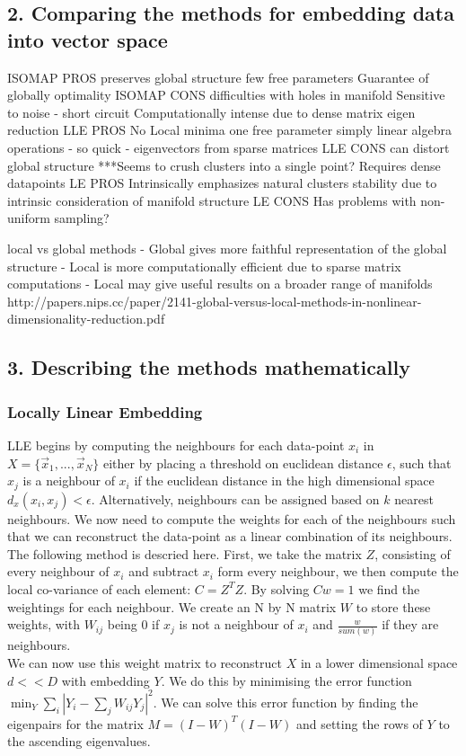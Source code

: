 \documentclass{article}
\begin{document}
\subsection{2. Comparing the methods for embedding data into vector space}
ISOMAP PROS
preserves global structure
few free parameters
Guarantee of globally optimality
ISOMAP CONS
difficulties with holes in manifold
Sensitive to noise - short circuit 
Computationally intense due to dense matrix eigen reduction 
LLE PROS
No Local minima
one free parameter
simply linear algebra operations - so quick - eigenvectors from sparse matrices 
LLE CONS
can distort global structure 
***Seems to crush clusters into a single point?
Requires dense datapoints
LE PROS
Intrinsically emphasizes natural clusters 
stability due to intrinsic consideration of manifold structure
LE CONS
Has problems with non-uniform sampling?

local vs global methods
- Global gives more faithful representation of the global structure
- Local is more computationally efficient due to sparse matrix computations 
- Local may give useful results on a broader range of manifolds
http://papers.nips.cc/paper/2141-global-versus-local-methods-in-nonlinear-dimensionality-reduction.pdf
\subsection{3. Describing the methods mathematically}
\subsubsection{Locally Linear Embedding}
LLE begins by computing the neighbours for each data-point $x_i$ in $X = \{\vec{x}_1,...,\vec{x}_N\}$ either by placing a threshold on euclidean distance $\epsilon$, such that $x_j$ is a neighbour of $x_i$ if the euclidean distance in the high dimensional space $d_x(x_i,x_j) < \epsilon$. Alternatively, neighbours can be assigned based on $k$ nearest neighbours. We now need to compute the weights for each of the neighbours such that we can reconstruct the data-point as a linear combination of its neighbours. The following method is descried here.\cite{LLERoweis} First, we take the matrix $Z$, consisting of every neighbour of $x_i$ and subtract $x_i$ form every neighbour, we then compute the local co-variance of each element: $C = Z^TZ$. By solving $Cw = 1$ we find the weightings for each neighbour. We create an N by N matrix $W$ to store these weights, with $W_{ij}$ being 0 if $x_j$ is not a neighbour of $x_i$ and $\frac{w}{sum(w)}$ if they are neighbours.\\
We can now use this weight matrix to reconstruct $X$ in a lower dimensional space $d<<D$ with embedding $Y$. We do this by minimising the error function $\min_Y\sum\limits_{i}|Y_i-\sum\limits_{j}W_{ij}Y_j|^2$.\cite{ghodsi2006dimensionality} We can solve this error function by finding the eigenpairs for the matrix $M = (I-W)^T(I-W)$ and setting the rows of $Y$ to the ascending eigenvalues.
\end{document}
